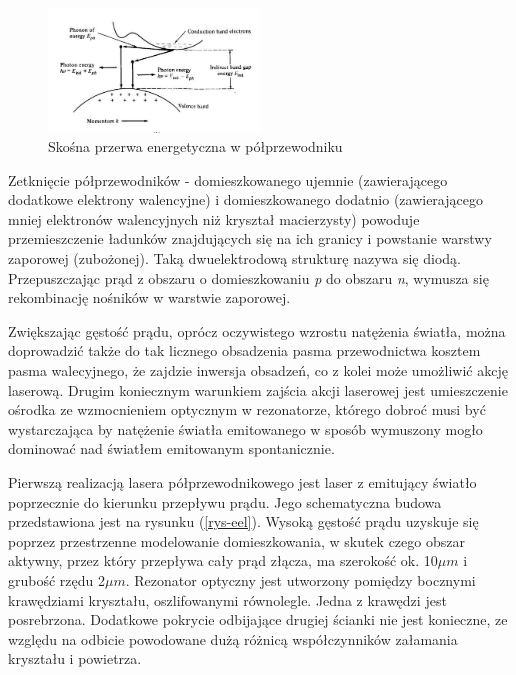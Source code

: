 \documentclass[a4paper,10pt]{article}
\begin{document}
\begin{figure}
\begin{center}
 \includegraphics[width=0.5\textwidth]{./obrazki/indirect_band_gap.jpeg}
\end{center}
\caption{Skośna przerwa energetyczna w półprzewodniku}
\label{indirectbandgap}
\end{figure}

Zetknięcie półprzewodników - domieszkowanego ujemnie (zawierającego dodatkowe elektrony walencyjne) i domieszkowanego dodatnio (zawierającego mniej elektronów walencyjnych niż kryształ macierzysty) powoduje przemieszczenie ładunków znajdujących się na ich granicy i powstanie warstwy zaporowej (zubożonej). Taką dwuelektrodową strukturę nazywa się diodą. Przepuszczając prąd z obszaru o domieszkowaniu \textit{p} do obszaru \textit{n}, wymusza się rekombinację nośników w warstwie zaporowej.  

Zwiększając gęstość prądu, oprócz oczywistego wzrostu natężenia światła, można doprowadzić także do tak licznego obsadzenia pasma przewodnictwa kosztem pasma walecyjnego, że zajdzie inwersja obsadzeń, co z kolei może umożliwić akcję laserową. Drugim koniecznym warunkiem zajścia akcji laserowej jest umieszczenie ośrodka ze wzmocnieniem optycznym w rezonatorze, którego dobroć musi być wystarczająca by natężenie światła emitowanego w sposób wymuszony mogło dominować nad światłem emitowanym spontanicznie.

Pierwszą realizacją lasera półprzewodnikowego jest laser z emitujący światło poprzecznie do kierunku przepływu prądu. Jego schematyczna budowa przedstawiona jest na rysunku (\ref{rys-eel}). Wysoką gęstość prądu uzyskuje się poprzez przestrzenne modelowanie domieszkowania, w skutek czego obszar aktywny, przez który przepływa cały prąd złącza, ma szerokość ok. 10$\mu m$ i grubość rzędu 2$\mu m$. Rezonator optyczny jest utworzony pomiędzy bocznymi krawędziami kryształu, oszlifowanymi równolegle. Jedna z krawędzi jest posrebrzona. Dodatkowe pokrycie odbijające drugiej ścianki nie jest konieczne, ze względu na odbicie powodowane dużą różnicą współczynników załamania kryształu i powietrza.
\end{document}
